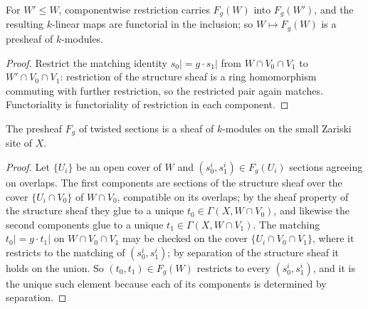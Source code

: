 \begin{lemma}
  \label{pa-lem:twistSections_presheaf}
  \leanok

  For \(W' \le W\), componentwise restriction carries \(F_g(W)\) into \(F_g(W')\), and
  the resulting \(k\)-linear maps are functorial in the inclusion; so \(W \mapsto F_g(W)\)
  is a presheaf of \(k\)-modules.
\end{lemma}
\begin{proof}
  \leanok
  Restrict the matching identity \(s_0| = g \cdot s_1|\) from \(W \cap V_0 \cap V_1\) to
  \(W' \cap V_0 \cap V_1\): restriction of the structure sheaf is a ring homomorphism
  commuting with further restriction, so the restricted pair again matches.
  Functoriality is functoriality of restriction in each component.
\end{proof}

\begin{theorem}
  \label{pa-thm:twistSheaf}
  \leanok

  The presheaf \(F_g\) of twisted sections is a sheaf of \(k\)-modules on the small
  Zariski site of \(X\).
\end{theorem}
\begin{proof}
  \leanok
  Let \(\{U_i\}\) be an open cover of \(W\) and \((s_0^i, s_1^i) \in F_g(U_i)\) sections
  agreeing on overlaps. The first components are sections of the structure sheaf over the
  cover \(\{U_i \cap V_0\}\) of \(W \cap V_0\), compatible on its overlaps; by the sheaf
  property of the structure sheaf they glue to a unique \(t_0 \in \Gamma(X, W \cap V_0)\),
  and likewise the second components glue to a unique \(t_1 \in \Gamma(X, W \cap V_1)\).
  The matching \(t_0| = g \cdot t_1|\) on \(W \cap V_0 \cap V_1\) may be checked on the
  cover \(\{U_i \cap V_0 \cap V_1\}\), where it restricts to the matching of
  \((s_0^i, s_1^i)\); by separation of the structure sheaf it holds on the union. So
  \((t_0, t_1) \in F_g(W)\) restricts to every \((s_0^i, s_1^i)\), and it is the unique
  such element because each of its components is determined by separation.
\end{proof}

